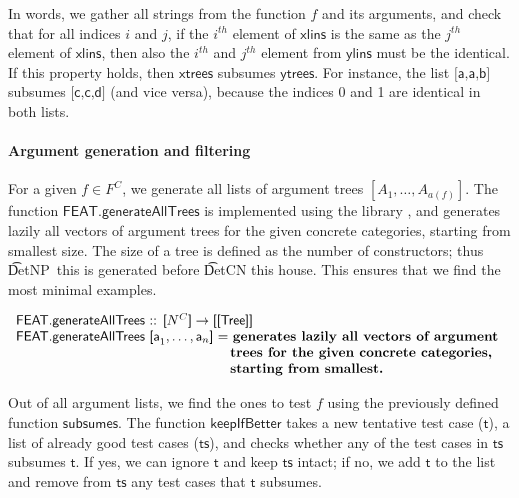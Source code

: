In words, we gather all strings from the function $f$ and its
arguments, and check that for all indices $i$ and $j$, if the $i^{th}$
element of $\textsf{xlins}$ is the same as the $j^{th}$ element of
$\textsf{xlins}$, then also the $i^{th}$ and $j^{th}$ element from
$\textsf{ylins}$ must be the identical.  If this property holds, then
$\textsf{xtrees}$ subsumes $\textsf{ytrees}$.  For instance, the list
$\textsf{[a,a,b]}$ subsumes $\textsf{[c,c,d]}$ (and vice versa),
because the indices 0 and 1 are identical in both lists.


\paragraph{Argument generation and filtering}
For a given $f \in F^C$, we generate all lists of argument trees
$[A_1, \dots, A_{a(f)}]$.
The function $\textsf{FEAT.generateAllTrees}$ is implemented using the
\feat{} library \cite{feat}, and generates lazily all vectors of
argument trees for the given concrete categories, starting from
smallest size.  The size of a tree is defined as the number of
constructors; thus \t{DetNP~this} is generated before \t{DetCN this
  house}. This ensures that we find the most minimal examples.


\begin{EmptyItem}
$\begin{array}{p{5.25cm} l}
\multicolumn{2}{l}{\textsf{FEAT.generateAllTrees :: [}N^C\textsf{]} \rightarrow \textsf{[[Tree]]}} \\
\multicolumn{2}{l}{\textsf{FEAT.generateAllTrees [a}_1,\ldots,\textsf{a}_n\textsf{] = } \textbf{generates lazily all vectors of argument }} \\
                                                                & \textbf{trees for the given concrete categories,} \\
                                                                & \textbf{starting from smallest.} \\
\end{array}$
\end{EmptyItem}


Out of all argument lists, we find the ones to test $f$ 
using the previously defined function $\textsf{subsumes}$.
The function $\textsf{keepIfBetter}$ takes a new tentative test case
($\textsf{t}$), a list of already good test cases ($\textsf{ts}$), and
checks whether any of the test cases in $\textsf{ts}$ subsumes
$\textsf{t}$. If yes, we can ignore $\textsf{t}$ and keep
$\textsf{ts}$ intact; if no, we add $\textsf{t}$ to the list and
remove from $\textsf{ts}$ any test cases that $\textsf{t}$ subsumes.

